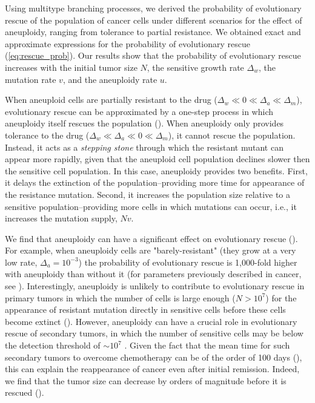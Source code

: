 \documentclass[12pt]{extarticle}
\begin{document}
Using multitype branching processes, we derived the probability of evolutionary rescue of the population of cancer cells under different scenarios for the effect of aneuploidy, ranging from tolerance to partial resistance.
We obtained exact and approximate expressions for the probability of evolutionary rescue (\cref{eq:rescue_prob}).
Our results show that the probability of evolutionary rescue increases with the initial tumor size $N$, the sensitive growth rate $\Delta_w$, the mutation rate $v$, and the aneuploidy rate $u$.

When aneuploid cells are partially resistant to the drug ($\Delta_w\ll0\ll\Delta_a\ll\Delta_m$), evolutionary rescue can be approximated by a one-step process in which aneuploidy itself rescues the population (). 
When aneuploidy only provides tolerance to the drug ($\Delta_w\ll\Delta_a\ll0\ll\Delta_m$), it cannot rescue the population.
Instead, it acts as a \emph{stepping stone} through which the resistant mutant can appear more rapidly, given that the aneuploid cell population declines slower then the sensitive cell population. In this case, aneuploidy provides two benefits. First, it delays the extinction of the population--providing more time for appearance of the resistance mutation. Second, it increases the population size relative to a sensitive population--providing more cells in which mutations can occur, i.e., it increases the mutation supply, $Nv$.

We find that aneuploidy can have a significant effect on evolutionary rescue (). For example, when aneuploidy cells are "barely-resistant" (they grow at a very low rate, $\Delta_a=10^{-3}$) the probability of evolutionary rescue is 1,000-fold higher with aneuploidy than without it (for parameters previously described in cancer, see ).
Interestingly, aneuploidy is unlikely to contribute to evolutionary rescue in primary tumors in which the number of cells is large enough ($N>10^7$) for the appearance of resistant mutation directly in sensitive cells before these cells become extinct ().
However, aneuploidy can have a crucial role in evolutionary rescue of secondary tumors, in which the number of sensitive cells may be below the detection threshold of $\sim10^7$  \citep{bozic2013evolutionary}.
Given the fact that the mean time for such secondary tumors to overcome chemotherapy can be of the order of 100 days (), %
this can explain the reappearance of cancer even after initial remission.
Indeed, we find that the tumor size can decrease by orders of magnitude before it is rescued ().
\end{document}
